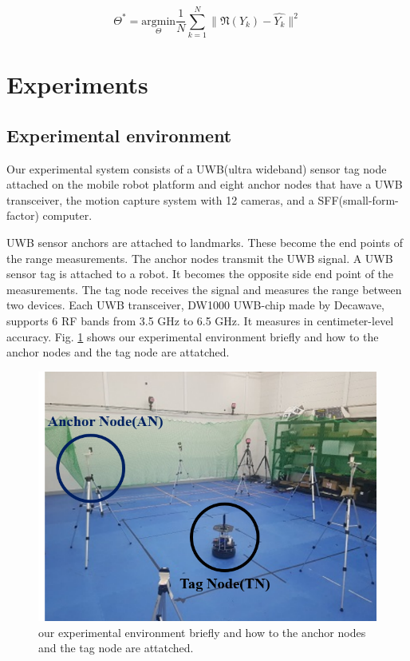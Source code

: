 \documentclass[letterpaper, 10 pt, conference]{ieeeconf}  %
\begin{document}
\begin{equation}
\Theta^{*} = \underset{\Theta}{\mathrm{argmin}} \frac{1}{N} \sum_{k=1}^N \parallel \mathfrak{N}(Y_k) - \hat{Y_k} \parallel^{2}
\end{equation}  


\section{Experiments}
\subsection{Experimental environment}

Our experimental system consists of a UWB(ultra wideband) sensor tag node attached on the mobile robot platform and eight anchor nodes that have a UWB transceiver, the motion capture system with 12 cameras, and a SFF(small-form-factor) computer.

UWB sensor anchors are attached to landmarks. These become the end points of the range measurements. The anchor nodes transmit the UWB signal. A UWB sensor tag is attached to a robot. It becomes the opposite side end point of the measurements. The tag node receives the signal and measures the range between two devices. Each UWB transceiver, DW1000 UWB-chip made by Decawave, supports 6 RF bands from 3.5 GHz to 6.5 GHz. It measures in centimeter-level accuracy. Fig. \ref{fig:anchor_tag_nodes} shows our experimental environment briefly and how to the anchor nodes and the tag node are attatched.

\begin{figure}[h!]
	\centering
	\includegraphics[width=.9\linewidth]{image/anchor_tag_nodes}
	\caption{our experimental environment briefly and how to the anchor nodes and the tag node are attatched.}
	\label{fig:anchor_tag_nodes}
\end{figure}
\end{document}
